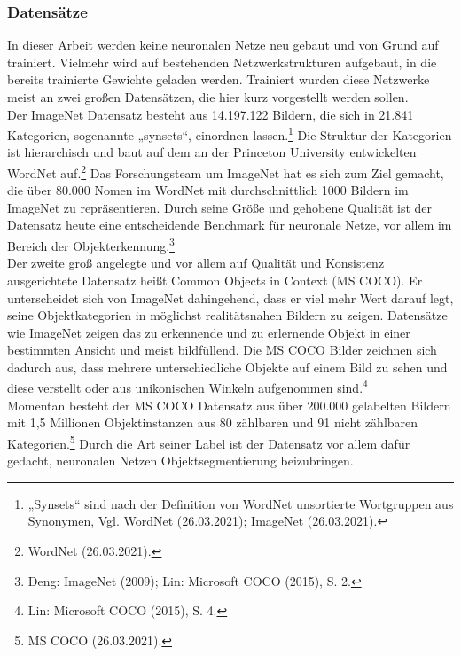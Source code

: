 \documentclass[a4paper,12pt,ngerman]{article}
\begin{document}
\subsubsection{Datensätze}
In dieser Arbeit werden keine neuronalen Netze neu gebaut und von Grund auf trainiert. Vielmehr wird auf bestehenden Netzwerkstrukturen aufgebaut, in die bereits trainierte Gewichte geladen werden. Trainiert wurden diese Netzwerke meist an zwei großen Datensätzen, die hier kurz vorgestellt werden sollen. \\
Der ImageNet Datensatz besteht aus 14.197.122 Bildern, die sich in 21.841 Kategorien, sogenannte „synsets“, einordnen lassen.\footnote{„Synsets“ sind nach der Definition von WordNet unsortierte Wortgruppen aus Synonymen, Vgl. WordNet (26.03.2021); ImageNet (26.03.2021).}  Die Struktur der Kategorien ist hierarchisch und baut auf dem an der Princeton University entwickelten WordNet auf.\footnote{WordNet (26.03.2021).}  Das Forschungsteam um ImageNet hat es sich zum Ziel gemacht, die über 80.000 Nomen im WordNet mit durchschnittlich 1000 Bildern im ImageNet zu repräsentieren. Durch seine Größe und gehobene Qualität ist der Datensatz heute eine entscheidende Benchmark für neuronale Netze, vor allem im Bereich der Objekterkennung.\footnote{Deng: ImageNet (2009); Lin: Microsoft COCO (2015), S. 2.} \\
Der zweite groß angelegte und vor allem auf Qualität und Konsistenz ausgerichtete Datensatz heißt Common Objects in Context (MS COCO). Er unterscheidet sich von ImageNet dahingehend, dass er viel mehr Wert darauf legt, seine Objektkategorien in möglichst realitätsnahen Bildern zu zeigen. Datensätze wie ImageNet zeigen das zu erkennende und zu erlernende Objekt in einer bestimmten Ansicht und meist bildfüllend. Die MS COCO Bilder zeichnen sich dadurch aus, dass mehrere unterschiedliche Objekte auf einem Bild zu sehen und diese verstellt oder aus unikonischen Winkeln aufgenommen sind.\footnote{Lin: Microsoft COCO (2015), S. 4.} \\
Momentan besteht der MS COCO Datensatz aus über 200.000 gelabelten Bildern mit 1,5 Millionen Objektinstanzen aus 80 zählbaren und 91 nicht zählbaren Kategorien.\footnote{MS COCO (26.03.2021).} Durch die Art seiner Label ist der Datensatz vor allem dafür gedacht, neuronalen Netzen Objektsegmentierung beizubringen.
\end{document}
